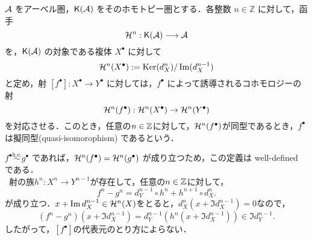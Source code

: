 \begin{defn}\cite[p.301]{KS06}
${\mathcal A}$ をアーベル圏，$\mathsf{K}({\mathcal A})$ をそのホモトピー圏とする．各整数 $n \in \mathbb{Z}$ に対して，函手
\[
{\mathcal H}^n: \mathsf{K}({\mathcal A}) \longrightarrow {\mathcal A}
\]
を，$\mathsf{K}({\mathcal A})$ の対象である複体 $X^\bullet$ に対して
\[
{\mathcal H}^n(X^\bullet) := \operatorname{Ker}(d_X^n)/\Im(d_X^{n-1})
\]
と定め，射 $[f^\bullet]: X^\bullet \to Y^\bullet$ に対しては，$f^\bullet$ によって誘導されるコホモロジーの射
\[
{\mathcal H}^n(f^\bullet): {\mathcal H}^n(X^\bullet) \to {\mathcal H}^n(Y^\bullet)
\]
を対応させる．このとき，任意の$n\in{\mathbb Z}$に対して，${\mathcal H}^n(f^\bullet)$が同型であるとき，$f^\bullet$は擬同型(quasi-isomorophism) であるという．

$f^\bullet \overset{\mathrm{h.e.}}{\sim} g^\bullet$ であれば，${\mathcal H}^n(f^\bullet) = {\mathcal H}^n(g^\bullet)$ が成り立つため，この定義は well-defined である．\\
\because\ 射の族$h^n\colon X^n\to Y^{n-1}$が存在して，任意の$n\in{\mathbb Z}$に対して，
\[
f^n - g^n = d_Y^{n-1} \circ h^n + h^{n+1} \circ d_X^n.
\]
が成り立つ．$x + \Im d_X^{n-1} \in {\mathcal H}^n(X)$をとると，$d_X^n(x + \Im d_X^{n-1}) = 0$なので，
\[
	(f^n - g^n)(x + \Im d_X^{n-1}) = d_Y^{n-1} (h^n(x + \Im d_X^{n-1})) \in \Im d_Y^{n-1}. 
\]
したがって，$[f^\bullet]$の代表元のとり方によらない．
\end{defn}

